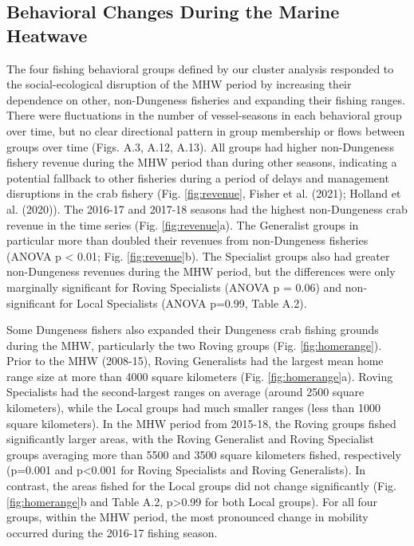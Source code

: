 \documentclass[]{elsarticle} %
\begin{document}
\hypertarget{behavioral-changes-during-the-marine-heatwave}{%
\subsection{Behavioral Changes During the Marine
Heatwave}\label{behavioral-changes-during-the-marine-heatwave}}

The four fishing behavioral groups defined by our cluster analysis
responded to the social-ecological disruption of the MHW period by
increasing their dependence on other, non-Dungeness fisheries and
expanding their fishing ranges. There were fluctuations in the number of
vessel-seasons in each behavioral group over time, but no clear
directional pattern in group membership or flows between groups over
time (Figs. A.3, A.12, A.13). All groups had higher non-Dungeness
fishery revenue during the MHW period than during other seasons,
indicating a potential fallback to other fisheries during a period of
delays and management disruptions in the crab fishery (Fig.
\ref{fig:revenue}, Fisher et al. (2021); Holland et al. (2020)). The
2016-17 and 2017-18 seasons had the highest non-Dungeness crab revenue
in the time series (Fig. \ref{fig:revenue}a). The Generalist groups in
particular more than doubled their revenues from non-Dungeness fisheries
(ANOVA p \textless{} 0.01; Fig. \ref{fig:revenue}b). The Specialist
groups also had greater non-Dungeness revenues during the MHW period,
but the differences were only marginally significant for Roving
Specialists (ANOVA p = 0.06) and non-significant for Local Specialists
(ANOVA p=0.99, Table A.2).

Some Dungeness fishers also expanded their Dungeness crab fishing
grounds during the MHW, particularly the two Roving groups (Fig.
\ref{fig:homerange}). Prior to the MHW (2008-15), Roving Generalists had
the largest mean home range size at more than 4000 square kilometers
(Fig. \ref{fig:homerange}a). Roving Specialists had the second-largest
ranges on average (around 2500 square kilometers), while the Local
groups had much smaller ranges (less than 1000 square kilometers). In
the MHW period from 2015-18, the Roving groups fished significantly
larger areas, with the Roving Generalist and Roving Specialist groups
averaging more than 5500 and 3500 square kilometers fished, respectively
(p=0.001 and p\textless0.001 for Roving Specialists and Roving
Generalists). In contrast, the areas fished for the Local groups did not
change significantly (Fig. \ref{fig:homerange}b and Table A.2,
p\textgreater0.99 for both Local groups). For all four groups, within
the MHW period, the most pronounced change in mobility occurred during
the 2016-17 fishing season.
\end{document}
